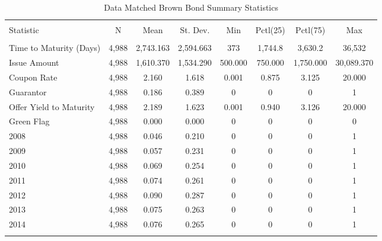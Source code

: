 \begin{table}[!htbp] \centering 
  \footnotesize
  \caption{Data Matched Brown Bond Summary Statistics} 
  \label{} 
\begin{tabular}{@{\extracolsep{5pt}}lccccccc} 
\\[-1.8ex]\hline 
\hline \\[-1.8ex] 
Statistic & \multicolumn{1}{c}{N} & \multicolumn{1}{c}{Mean} & \multicolumn{1}{c}{St. Dev.} & \multicolumn{1}{c}{Min} & \multicolumn{1}{c}{Pctl(25)} & \multicolumn{1}{c}{Pctl(75)} & \multicolumn{1}{c}{Max} \\ 
\hline \\[-1.8ex] 
Time to Maturity (Days) & 4,988 & 2,743.163 & 2,594.663 & 373 & 1,744.8 & 3,630.2 & 36,532 \\ 
Issue Amount & 4,988 & 1,610.370 & 1,534.290 & 500.000 & 750.000 & 1,750.000 & 30,089.370 \\ 
Coupon Rate & 4,988 & 2.160 & 1.618 & 0.001 & 0.875 & 3.125 & 20.000 \\ 
Guarantor & 4,988 & 0.186 & 0.389 & 0 & 0 & 0 & 1 \\ 
Offer Yield to Maturity & 4,988 & 2.189 & 1.623 & 0.001 & 0.940 & 3.126 & 20.000 \\
Green Flag & 4,988 & 0.000 & 0.000 & 0 & 0 & 0 & 0 \\ 
2008 & 4,988 & 0.046 & 0.210 & 0 & 0 & 0 & 1 \\ 
2009 & 4,988 & 0.057 & 0.231 & 0 & 0 & 0 & 1 \\ 
2010 & 4,988 & 0.069 & 0.254 & 0 & 0 & 0 & 1 \\ 
2011 & 4,988 & 0.074 & 0.261 & 0 & 0 & 0 & 1 \\
2012 & 4,988 & 0.090 & 0.287 & 0 & 0 & 0 & 1 \\ 
2013 & 4,988 & 0.075 & 0.263 & 0 & 0 & 0 & 1 \\ 
2014 & 4,988 & 0.076 & 0.265 & 0 & 0 & 0 & 1 \\ 
\hline \\[-1.8ex] 
\end{tabular} 
\end{table} 

\newpage

